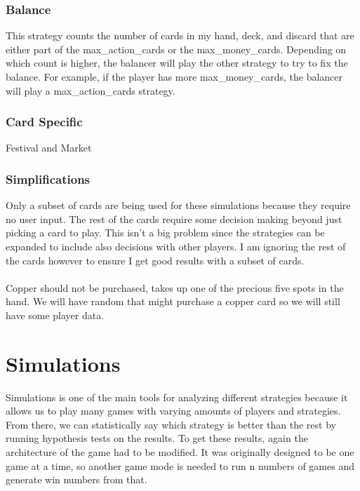 \documentclass[11pt, oneside]{article}   	%
\begin{document}
\subsubsection{Balance}

This strategy counts the number of cards in my hand, deck, and discard that are either part of the max\_action\_cards or the max\_money\_cards. Depending on which count is higher, the balancer will play the other strategy to try to fix the balance. For example, if the player has more max\_money\_cards, the balancer will play a max\_action\_cards strategy. 

\subsubsection{Card Specific}

Festival and Market

\subsubsection{Simplifications}

Only a subset of cards are being used for these simulations because they require no user input. The rest of the cards require some decision making beyond just picking a card to play. This isn't a big problem since the strategies can be expanded to include also decisions with other players. I am ignoring the rest of the cards however to ensure I get good results with a subset of cards. \\
\\
Copper should not be purchased, takes up one of the precious five spots in the hand. We will have random that might purchase a copper card so we will still have some player data. 

\section{Simulations}

Simulations is one of the main tools for analyzing different strategies because it allows us to play many games with varying amounts of players and strategies. From there, we can statistically say which strategy is better than the rest by running hypothesis tests on the results. To get these results, again the architecture of the game had to be modified. It was originally designed to be one game at a time, so another game mode is needed to run n numbers of games and generate win numbers from that. 
\end{document}
